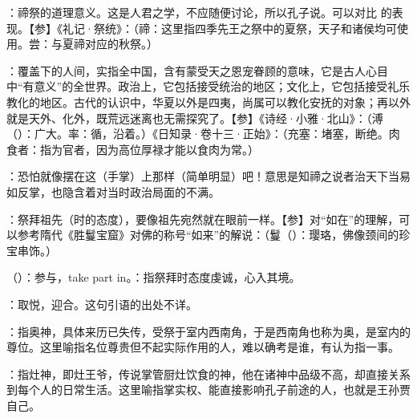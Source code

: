 {
\item {}：禘祭的道理意义。这是人君之学，不应随便讨论，所以孔子说。可以对比  的表现。【参】《礼记·祭统》：（禘：这里指四季先王之祭中的夏祭，天子和诸侯均可使用。尝：与夏禘对应的秋祭。）

\item {}：覆盖下的人间，实指全中国，含有蒙受天之恩宠眷顾的意味，它是古人心目中“有意义”的全世界。政治上，它包括接受统治的地区；文化上，它包括接受礼乐教化的地区。古代的认识中，华夏以外是四夷，尚属可以教化安抚的对象；再以外就是天外、化外，既荒远迷离也无需探究了。【参】《诗经·小雅·北山》：（溥（）：广大。率：循，沿着。）《日知录·卷十三·正始》：（充塞：堵塞，断绝。肉食者：指为官者，因为高位厚禄才能以食肉为常。）

\item {}：恐怕就像摆在这（手掌）上那样（简单明显）吧！意思是知禘之说者治天下当易如反掌，也隐含着对当时政治局面的不满。
}
{}


{
\item {}：祭拜祖先（时的态度），要像祖先宛然就在眼前一样。【参】对“如在”的理解，可以参考隋代《胜鬘宝窟》对佛的称号“如来”的解说：（鬘（）：璎珞，佛像颈间的珍宝串饰。）
\item {}（）：参与，take part in。：指祭拜时态度虔诚，心入其境。
}
{}  %


{
\item {}：取悦，迎合。这句引语的出处不详。
\item {}：指奥神，具体来历已失传，受祭于室内西南角，于是西南角也称为奥，是室内的尊位。这里喻指名位尊贵但不起实际作用的人，难以确考是谁，有认为指一事。%
\item {}：指灶神，即灶王爷，传说掌管厨灶饮食的神，他在诸神中品级不高，却直接关系到每个人的日常生活。这里喻指掌实权、能直接影响孔子前途的人，也就是王孙贾自己。
}
{}


